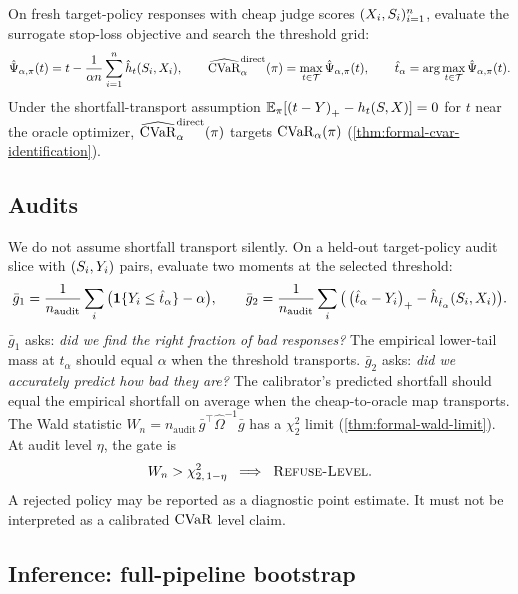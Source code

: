 On fresh target-policy responses with cheap judge scores
$(X_i, S_i)_{i=1}^{n}$, evaluate the surrogate stop-loss
objective and search the threshold grid:
\begin{equation}
\hat\Psi_{\alpha,\pi}(t) = t - \frac{1}{\alpha n}\sum_{i=1}^{n}
\hat h_t(S_i, X_i),
\qquad
\widehat{\mathrm{CVaR}}_{\alpha}^{\mathrm{direct}}(\pi) =
\max_{t \in \mathcal{T}}\hat\Psi_{\alpha,\pi}(t),
\qquad
\hat t_\alpha = \arg\max_{t \in \mathcal{T}}
\hat\Psi_{\alpha,\pi}(t).
\label{eq:direct-estimator}
\end{equation}
Under the shortfall-transport assumption $\mathbb{E}_\pi[\left(t-Y\right)_{+}
- h_t(S, X)] = 0$ for $t$ near the oracle optimizer,
$\widehat{\mathrm{CVaR}}_{\alpha}^{\mathrm{direct}}(\pi)$ targets
$\mathrm{CVaR}_\alpha(\pi)$ (\cref{thm:formal-cvar-identification}).

\subsection{Audits}
\label{sec:method-audits}

We do not assume shortfall transport silently. On a held-out
target-policy audit slice with $(S_i, Y_i)$ pairs, evaluate two
moments at the selected threshold:
\begin{equation}
\bar g_1 = \frac{1}{n_{\mathrm{audit}}}\sum_i \big(\mathbf{1}\{Y_i \le
\hat t_\alpha\} - \alpha\big),
\qquad
\bar g_2 = \frac{1}{n_{\mathrm{audit}}}\sum_i \big(\left(\hat t_\alpha-Y_i\right)_{+} - \hat h_{\hat t_\alpha}(S_i, X_i)\big).
\label{eq:audit}
\end{equation}
$\bar g_1$ asks: \emph{did we find the right fraction of bad responses?}
The empirical lower-tail mass at $\hat t_\alpha$ should equal $\alpha$
when the threshold transports.
$\bar g_2$ asks: \emph{did we accurately predict how bad they are?} The
calibrator's predicted shortfall should equal the empirical shortfall on
average when the cheap-to-oracle map transports. The Wald statistic
$W_n = n_{\mathrm{audit}}\,\bar g^\top\hat\Omega^{-1}\bar g$ has a
$\chi^2_2$ limit (\cref{thm:formal-wald-limit}). At audit level $\eta$,
the gate is
\begin{equation}
W_n > \chi^2_{2,\,1-\eta} \;\;\Longrightarrow\;\;
\textsc{Refuse-Level}.
\label{eq:gate}
\end{equation}
A rejected policy may be reported as a diagnostic point estimate. It
must not be interpreted as a calibrated $\mathrm{CVaR}$ level claim.

\subsection{Inference: full-pipeline bootstrap}
\label{sec:method-inference}

